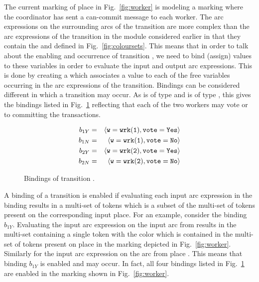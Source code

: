 The current marking of place  in
Fig.~\ref{fig:worker} is  modeling a
marking where the coordinator has sent a can-commit message to each
worker. The
arc expressions on the surrounding arcs of the
 transition are more complex than the arc
expressions of the  transition in the
 module considered earlier in that they contain
the   and  defined in
Fig.~\ref{fig:coloursets}. This means that in order to talk about the
enabling and occurrence of transition , we
need to bind (assign) values to these variables in order to evaluate
the input and output arc expressions. This is done by creating a
 which associates a value to each of the free
variables occurring in the arc expressions of the transition. Bindings
can be considered different  in which a transition may occur.  As
 is of type  and  is of type
, this gives the bindings listed in
Fig.~\ref{fig:bindings} reflecting that each of the two workers may
vote  or  to committing the transactions.

\begin{figure}[]
\centering
\begin{eqnarray*}
b_{1Y} & = & \langle {\tt{w}} = {\tt{wrk(1)}}, {\tt{vote}} = {\tt{Yes}} \rangle \\
b_{1N} & = & \langle {\tt{w}} = {\tt{wrk(1)}}, {\tt{vote}} = {\tt{No}} \rangle \\
b_{2Y} & = & \langle {\tt{w}} = {\tt{wrk(2)}}, {\tt{vote}} = {\tt{Yes}} \rangle \\
b_{2N} & = & \langle {\tt{w}} = {\tt{wrk(2)}}, {\tt{vote}} = {\tt{No}} \rangle
\end{eqnarray*}
\caption{Bindings of transition .}
\label{fig:bindings}
\end{figure}

A binding of a transition is enabled if evaluating each input arc
expression in the binding results in a multi-set of tokens which is a
subset of the multi-set of tokens present on the corresponding input
place. For an example, consider the binding $b_{1Y}$. Evaluating the
input arc expression  on the input arc from 
results in the multi-set containing a single token with the color
 which is contained in the multi-set of tokens present
on place  in the marking depicted in
Fig.~\ref{fig:worker}. Similarly for the input arc expression on the
arc from place . This means that binding $b_{1Y}$
is enabled and may occur. In fact, all four bindings listed in
Fig.~\ref{fig:bindings} are enabled in the marking shown in
Fig.~\ref{fig:worker}.

